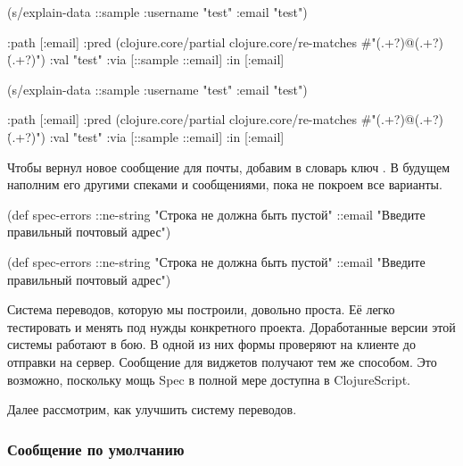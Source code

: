 \ifnarrow

\begin{clojure}
(s/explain-data ::sample
  {:username "test" :email "test"})

{:path [:email]
 :pred
 (clojure.core/partial
  clojure.core/re-matches
  #"(.+?)@(.+?)\.(.+?)")
 :val "test"
 :via [::sample ::email]
 :in [:email]}
\end{clojure}

\else

\begin{clojure}
(s/explain-data ::sample {:username "test" :email "test"})

{:path [:email]
 :pred
 (clojure.core/partial
  clojure.core/re-matches
  #"(.+?)@(.+?)\.(.+?)")
 :val "test"
 :via [::sample ::email]
 :in [:email]}
\end{clojure}

\fi

Чтобы  вернул новое сообщение для почты, добавим в словарь
ключ . В будущем наполним его другими спеками и сообщениями, пока
не покроем все варианты.

\ifnarrow

\begin{clojure}
(def spec-errors
  {::ne-string
   "Строка не должна быть пустой"
   ::email
   "Введите правильный почтовый адрес"})
\end{clojure}

\else

\begin{clojure}
(def spec-errors
  {::ne-string "Строка не должна быть пустой"
   ::email "Введите правильный почтовый адрес"})
\end{clojure}

\fi


Система переводов, которую мы построили, довольно проста. Её легко тестировать и
менять под нужды конкретного проекта. Доработанные версии этой системы работают
в бою. В одной из них формы проверяют на клиенте до отправки на
сервер. Сообщение для виджетов получают тем же способом. Это возможно, поскольку
мощь Spec в полной мере доступна в ClojureScript.

Далее рассмотрим, как улучшить систему переводов.

\subsubsection*{Сообщение по умолчанию}

